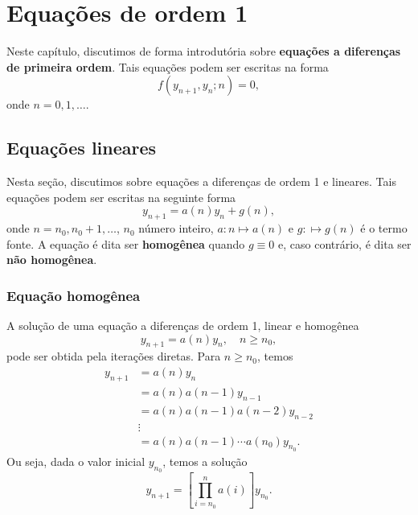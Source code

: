 
\chapter{Equações de ordem 1}\label{cap_ead1}

Neste capítulo, discutimos de forma introdutória sobre {\bf equações a diferenças de primeira ordem}. Tais equações podem ser escritas na forma
\begin{equation}
  f(y_{n+1},y_n;n)=0,
\end{equation}
onde $n=0, 1, \ldots$.

\section{Equações lineares}\label{cap_ead1_sec_eqlin}

Nesta seção, discutimos sobre equações a diferenças de ordem 1 e lineares. Tais equações podem ser escritas na seguinte forma
\begin{equation}
  y_{n+1} = a(n)y_n + g(n),
\end{equation}
onde $n=n_0, n_0+1, \ldots$, $n_0$ número inteiro, $a:n\mapsto a(n)$ e $g:\mapsto g(n)$ é o termo fonte. A equação é dita ser {\bf homogênea} quando $g\equiv 0$ e, caso contrário, é dita ser {\bf não homogênea}.

\subsection{Equação homogênea}

A solução de uma equação a diferenças de ordem 1, linear e homogênea
\begin{equation}\label{eq:ead1_linear_eqh}
  y_{n+1} = a(n)y_n,\quad n\geq n_0,
\end{equation}
pode ser obtida pela iterações diretas. Para $n\geq n_0$, temos
\begin{align}
  y_{n+1} &= a(n)y_n \\
          &= a(n)a(n-1)y_{n-1}\\
          &= a(n)a(n-1)a(n-2)y_{n-2} \\
          &\vdots\\
          &= a(n)a(n-1)\cdots a(n_0)y_{n_0}.
\end{align}
Ou seja, dada o valor inicial $y_{n_0}$, temos a solução
\begin{equation}\label{eq:ead1_linear_eqh_sol}
  y_{n+1} = \left[\prod_{i=n_0}^{n}a(i)\right]y_{n_0}.
\end{equation}

